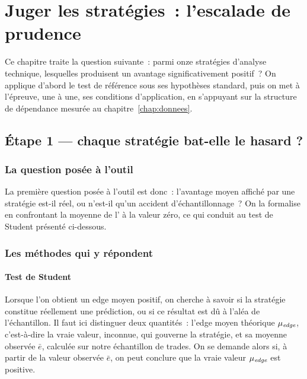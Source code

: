 \chapter{Juger les stratégies~: l'escalade de prudence}
\label{chap:juger}

Ce chapitre traite la question suivante~: parmi onze stratégies
d'analyse technique, lesquelles produisent un avantage \edgevar{}
significativement positif~? On applique d'abord le test de référence
sous ses hypothèses standard, puis on met à l'épreuve, une à une, ses
conditions d'application, en s'appuyant sur la structure de dépendance
mesurée au chapitre~\ref{chap:donnees}.

\section{Étape 1 --- chaque stratégie bat-elle le hasard ?}
\label{sec:b1-etape1}

\subsection{La question posée à l'outil}

La première question posée à l'outil est donc~: l'avantage moyen affiché
par une stratégie est-il réel, ou n'est-il qu'un accident
d'échantillonnage~? On la formalise en confrontant la moyenne de
l'\edgevar{} à la valeur zéro, ce qui conduit au test de Student
présenté ci-dessous.

\subsection{Les méthodes qui y répondent}

\subsubsection*{Test de Student}

Lorsque l'on obtient un edge moyen positif, on cherche à savoir si la
stratégie constitue réellement une prédiction, ou si ce résultat est dû
à l'aléa de l'échantillon. Il faut ici distinguer deux quantités~:
l'edge moyen théorique \(\mu_{\textit{edge}}\), c'est-à-dire la vraie valeur,
inconnue, qui gouverne la stratégie, et sa moyenne observée \(\bar e\),
calculée sur notre échantillon de trades. On se demande alors si, à
partir de la valeur observée \(\bar e\), on peut conclure que la vraie
valeur \(\mu_{\textit{edge}}\) est positive.


